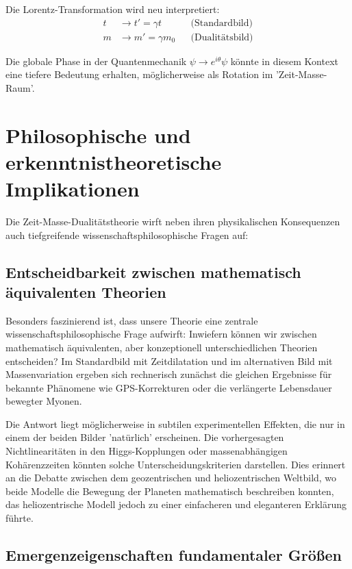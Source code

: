 \documentclass[a4paper,12pt]{article}
\begin{document}
	Die Lorentz-Transformation wird neu interpretiert:
	\begin{align}
		t &\to t' = \gamma t & &\text{(Standardbild)} \\
		m &\to m' = \gamma m_0 & &\text{(Dualitätsbild)}
	\end{align}
	
	Die globale Phase in der Quantenmechanik $\psi \to e^{i\theta}\psi$ könnte in diesem Kontext eine tiefere Bedeutung erhalten, möglicherweise als Rotation im 'Zeit-Masse-Raum'.
	
	\section{Philosophische und erkenntnistheoretische Implikationen}
	
	Die Zeit-Masse-Dualitätstheorie wirft neben ihren physikalischen Konsequenzen auch tiefgreifende wissenschaftsphilosophische Fragen auf:
	
	\subsection{Entscheidbarkeit zwischen mathematisch äquivalenten Theorien}
	
	Besonders faszinierend ist, dass unsere Theorie eine zentrale wissenschaftsphilosophische Frage aufwirft: Inwiefern können wir zwischen mathematisch äquivalenten, aber konzeptionell unterschiedlichen Theorien entscheiden? Im Standardbild mit Zeitdilatation und im alternativen Bild mit Massenvariation ergeben sich rechnerisch zunächst die gleichen Ergebnisse für bekannte Phänomene wie GPS-Korrekturen oder die verlängerte Lebensdauer bewegter Myonen.
	
	Die Antwort liegt möglicherweise in subtilen experimentellen Effekten, die nur in einem der beiden Bilder 'natürlich' erscheinen. Die vorhergesagten Nichtlinearitäten in den Higgs-Kopplungen oder massenabhängigen Kohärenzzeiten könnten solche Unterscheidungskriterien darstellen. Dies erinnert an die Debatte zwischen dem geozentrischen und heliozentrischen Weltbild, wo beide Modelle die Bewegung der Planeten mathematisch beschreiben konnten, das heliozentrische Modell jedoch zu einer einfacheren und eleganteren Erklärung führte.
	
	\subsection{Emergenzeigenschaften fundamentaler Größen}
	
\end{document}
